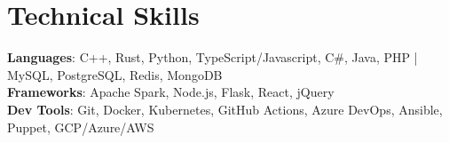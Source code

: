 \section{Technical Skills}
\begin{itemize}[leftmargin=0.15in, label={}]
    \small{\item{
        \textbf{Languages}{: C++, Rust, Python, TypeScript/Javascript, C\#, Java, PHP | MySQL, PostgreSQL, Redis, MongoDB} \\
        \textbf{Frameworks}{: Apache Spark, Node.js, Flask, React, jQuery} \\
        \textbf{Dev Tools}{: Git, Docker, Kubernetes, GitHub Actions, Azure DevOps, Ansible, Puppet, GCP/Azure/AWS} \\
    }}
\end{itemize}
